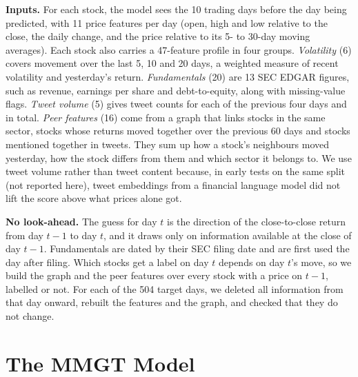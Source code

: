 \documentclass[conference]{IEEEtran}
\begin{document}
\textbf{Inputs.} For each stock, the model sees the 10 trading days before the day
being predicted, with 11 price features per day (open, high and low relative to the
close, the daily change, and the price relative to its 5- to 30-day moving averages).
Each stock also carries a 47-feature profile in four groups. \emph{Volatility} (6)
covers movement over the last 5, 10 and 20 days, a weighted measure of recent
volatility and yesterday's return. \emph{Fundamentals} (20) are 13 SEC EDGAR figures,
such as revenue, earnings per share and debt-to-equity, along with missing-value flags.
\emph{Tweet volume} (5) gives tweet counts for each of the previous four days and in
total. \emph{Peer features} (16) come from a graph that links stocks in the same
sector, stocks whose returns moved together over the previous 60 days and stocks
mentioned together in tweets. They sum up how a stock's neighbours moved yesterday,
how the stock differs from them and which sector it belongs to. We use tweet volume
rather than tweet content because, in early tests on the same split (not reported
here), tweet embeddings from a financial language model did not lift the score above
what prices alone got.

\textbf{No look-ahead.} The guess for day $t$ is the direction of the close-to-close
return from day $t-1$ to day $t$, and it draws only on information available at the
close of day $t-1$. Fundamentals are dated by their SEC filing date and are first used
the day after filing. Which stocks get a label on day $t$ depends on day $t$'s move, so
we build the graph and the peer features over every stock with a price on $t-1$,
labelled or not. For each of the 504 target days, we deleted all information from that
day onward, rebuilt the features and the graph, and checked that they do not change.

\section{The MMGT Model}
\end{document}
